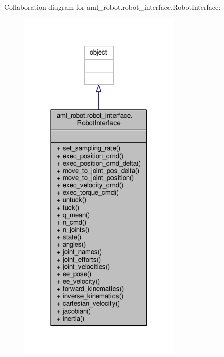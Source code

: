Collaboration diagram for aml\-\_\-robot.\-robot\-\_\-interface.\-Robot\-Interface\-:
\nopagebreak
\begin{figure}[H]
\begin{center}
\leavevmode
\includegraphics[width=222pt]{classaml__robot_1_1robot__interface_1_1_robot_interface__coll__graph}
\end{center}
\end{figure}

